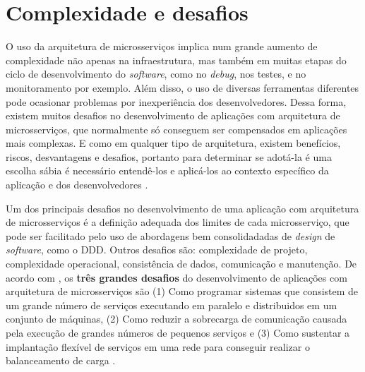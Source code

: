 
\section{Complexidade e desafios}

O uso da arquitetura de microsserviços implica num grande aumento de complexidade não apenas na infraestrutura, mas também em muitas etapas do ciclo de desenvolvimento do \emph{software}, como no \emph{debug}, nos testes, e no monitoramento por exemplo. Além disso, o uso de diversas ferramentas diferentes pode ocasionar problemas por inexperiência dos desenvolvedores. Dessa forma, existem muitos desafios no desenvolvimento de aplicações com arquitetura de microsserviços, que normalmente só conseguem ser compensados em aplicações mais complexas. E como em qualquer tipo de arquitetura, existem benefícios, riscos, desvantagens e desafios, portanto para determinar se adotá-la é uma escolha sábia é necessário entendê-los e aplicá-los ao contexto específico da aplicação e dos desenvolvedores \cite{top10-microservices-challenges,martin-fowler-microservice-tradeoffs}.

Um dos principais desafios no desenvolvimento de uma aplicação com arquitetura de microsserviços é a definição adequada dos limites de cada microsserviço, que pode ser facilitado pelo uso de abordagens bem consolidadadas de \emph{design} de \emph{software}, como o DDD. Outros desafios são: complexidade de projeto, complexidade operacional, consistência de dados, comunicação e manutenção. De acordo com , os \textbf{três grandes desafios} do desenvolvimento de aplicações com arquitetura de microsserviços são (1) Como programar sistemas que consistem de um grande número de serviços executando em paralelo e distribuidos em um conjunto de máquinas, (2) Como reduzir a sobrecarga de comunicação causada pela execução de grandes números de pequenos serviços e (3) Como sustentar a implantação flexível de serviços em uma rede para conseguir realizar o balanceamento de carga \cite{martin-fowler-monolith-first}.

